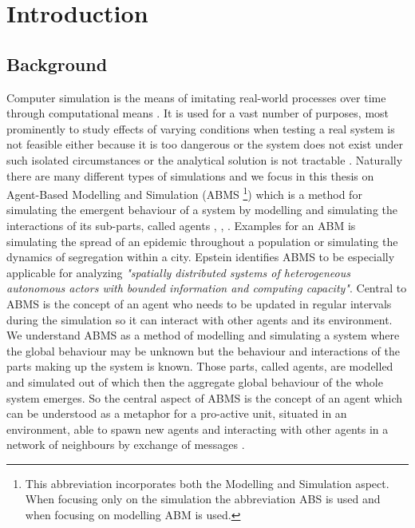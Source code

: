 \chapter{Introduction}
\label{chap:intro}

\section{Background}
Computer simulation is the means of imitating real-world processes over time through computational means \cite{banks_discrete-event_2013}. It is used for a vast number of purposes, most prominently to study effects of varying conditions when testing a real system is not feasible either because it is too dangerous or the system does not exist under such isolated circumstances or the analytical solution is not tractable \cite{sokolowski_principles_2009}. Naturally there are many different types of simulations and we focus in this thesis on Agent-Based Modelling and Simulation (ABMS \footnote{This abbreviation incorporates both the Modelling and Simulation aspect. When focusing only on the simulation the abbreviation ABS is used and when focusing on modelling ABM is used.}) which is a method for simulating the emergent behaviour of a system by modelling and simulating the interactions of its sub-parts, called agents \cite{siebers_introduction_2008}, \cite{axelrod_guide_2006}, \cite{wilensky_introduction_2015}. Examples for an ABM is simulating the spread of an epidemic throughout a population or simulating the dynamics of segregation within a city. Epstein \cite{epstein_generative_2012} identifies ABMS to be especially applicable for analyzing \textit{"spatially distributed systems of heterogeneous autonomous actors with bounded information and computing capacity"}. Central to ABMS is the concept of an agent who needs to be updated in regular intervals during the simulation so it can interact with other agents and its environment.
We understand ABMS as a method of modelling and simulating a system where the global behaviour may be unknown but the behaviour and interactions of the parts making up the system is known. Those parts, called agents, are modelled and simulated out of which then the aggregate global behaviour of the whole system emerges. So the central aspect of ABMS is the concept of an agent which can be understood as a metaphor for a pro-active unit, situated in an environment, able to spawn new agents and interacting with other agents in a network of neighbours by exchange of messages \cite{wooldridge_introduction_2009}.

